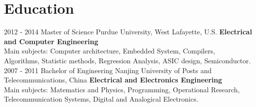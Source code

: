 \documentclass[]{friggeri-cv}
\begin{document}
\section{Education}
\begin{entrylist}
  \entry
    {2012 - 2014}
    {Master of Science}
    {Purdue University, West Lafayette, U.S.}
    {\textbf{Electrical and Computer Engineering\\}
Main subjects: Computer architecture, Embedded System, Compilers, Algorithms, Statistic methods, Regression Analysis, ASIC design, Semiconductor.\\}
  \entry
    {2007 - 2011}
    {Bachelor of Engineering}
    {Nanjing University of Posts and Telecommunications, China}
    {\textbf{Electrical and Electronics Engineering\\}
Main subjects: Matematics and Physics, Programming, Operational Research, Telecommunication Systems, Digital and Analogical Electronics.\\}

\end{entrylist}


\newpage
\end{document}
